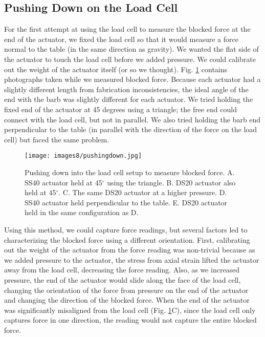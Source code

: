 \subsection{Pushing Down on the Load Cell}

For the first attempt at using the load cell to measure the blocked force at the end of the actuator, we fixed the load cell so that it would measure a force normal to the table (in the same direction as gravity). We wanted the flat side of the actuator to touch the load cell before we added pressure. We could calibrate out the weight of the actuator itself (or so we thought). Fig. \ref{fig:pushingdown} contains photographs taken while we measured blocked force. Because each actuator had a slightly different length from fabrication inconsistencies, the ideal angle of the end with the barb was slightly different for each actuator. We tried holding the fixed end of the actuator at 45 degrees using a triangle; the free end could connect with the load cell, but not in parallel. We also tried holding the barb end perpendicular to the table (in parallel with the direction of the force on the load cell) but faced the same problem. 

\begin{figure}[ht]
    \centering
     \texttt{[image: images8/pushingdown.jpg]}
    \caption{Pushing down into the load cell setup to measure blocked force. A. SS40 actuator held at 45$^\circ$ using the triangle. B. DS20 actuator also held at 45$^\circ$. C. The same DS20 actuator at a higher pressure. D. SS40 actuator held perpendicular to the table. E. DS20 actuator held in the same configuration as D.}
    \label{fig:pushingdown}
\end{figure}

Using this method, we could capture force readings, but several factors led to characterizing the blocked force using a different orientation. First, calibrating out the weight of the actuator from the force reading was non-trivial because as we added pressure to the actuator, the stress from axial strain lifted the actuator away from the load cell, decreasing the force reading. Also, as we increased pressure, the end of the actuator would slide along the face of the load cell, changing the orientation of the force from pressure on the end of the actuator and changing the direction of the blocked force. When the end of the actuator was significantly misaligned from the load cell (Fig. \ref{fig:pushingdown}C), since the load cell only captures force in one direction, the reading would not capture the entire blocked force. 

